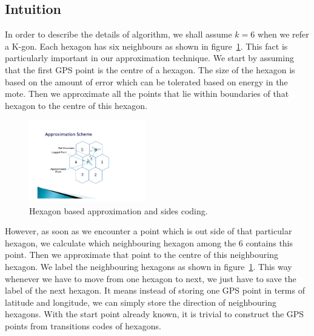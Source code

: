 \documentclass[conference]{IEEEtran}
\begin{document}
\subsection{Intuition}
\label{subs:Intution}
In order to describe the details of algorithm, we shall assume $k = 6$ when we refer a K-gon. Each hexagon 
has six neighbours as shown in figure~\ref{fig:multiple-hexagons}. This fact is particularly important in 
our approximation technique. We start by assuming that the first GPS point is the centre of  a hexagon. The 
size of the hexagon is based on the amount of error which can be tolerated based on energy in the mote. Then 
we approximate all the points that lie within boundaries of that hexagon to the centre of this hexagon. 
\begin{figure}[ht]
\centering
  \includegraphics[width=2in]{images/hexagon-figure.pdf}
  \caption {Hexagon based approximation and sides coding.}\label{fig:multiple-hexagons}
\end{figure}
However, as soon as we encounter a point which is out side of that particular hexagon, we calculate which 
neighbouring hexagon among the 6 contains this point. Then we approximate that point to the centre of this 
neighbouring hexagon. We label the neighbouring hexagons as shown in figure~\ref{fig:multiple-hexagons}. 
This way whenever we have to move from one hexagon to next, we just have to save the label of the next 
hexagon. It means instead of storing one GPS point in terms of latitude and longitude, we can simply store 
the direction of neighbouring hexagons. With the start point already known, it is trivial to construct the 
GPS points from transitions codes of hexagons.
\end{document}
